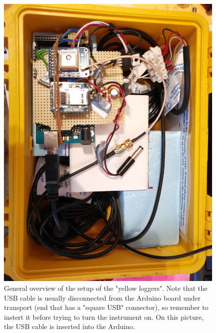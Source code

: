 \documentclass[pdftex,a4paper,12pt,twocolumn,fleqn,captions=tableheading]{scrartcl}
\begin{document}
  \begin{figure}
  \begin{center}
  \includegraphics[width=.8\textwidth]{Figures/general_overview}
  \caption{General overview of the setup of the "yellow loggers". Note that the USB cable is usually disconnected from the Arduino board under transport (end that has a "square USB" connector), so remember to instert it before trying to turn the instrument on. On this picture, the USB cable is inserted into the Arduino.}
  \end{center}
  \end{figure}
\end{document}

